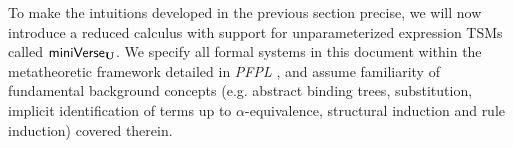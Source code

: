 

To make the intuitions developed in the previous section precise, we will now introduce a reduced calculus with support for unparameterized expression TSMs called $\mathsf{miniVerse}_\textbf{U}$. 
We specify all formal systems in this document within the metatheoretic framework detailed in \emph{PFPL} \cite{pfpl}, and assume familiarity of fundamental background concepts (e.g. abstract binding trees, substitution, implicit identification of terms up to $\alpha$-equivalence, structural induction and rule induction) covered therein. %

